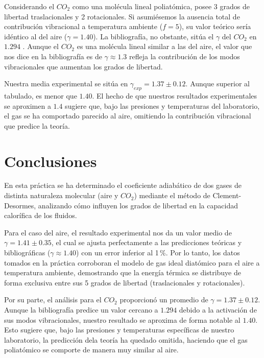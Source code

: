 \documentclass[11pt, a4paper]{article}
\begin{document}
Considerando el $CO_2$ como una molécula lineal poliatómica, posee 3 grados de libertad traslacionales y 2 rotacionales. Si asumiésemos la ausencia total de contribución vibracional a temperatura ambiente ($f=5$), su valor teórico sería idéntico al del aire ($\gamma = 1.40$). La bibliografía, no obstante, sitúa el $\gamma$ del $CO_2$ en $1.294$ \cite{young}. Aunque el $CO_2$ es una molécula lineal similar a las del aire, el valor que nos dice en la bibliografía es de $\gamma \approx 1.3$ refleja la contribución de los modos vibracionales que aumentan los grados de libertad.

Nuestra media experimental se sitúa en $\gamma_{exp} = 1.37 \pm 0.12$. Aunque superior al tabulado, es menor que $1.40$. El hecho de que nuestros resultados experimentales se aproximen a $1.4$ sugiere que, bajo las presiones y temperaturas del laboratorio, el gas se ha comportado parecido al aire, omitiendo la contribución vibracional que predice la teoría.

\section{Conclusiones}

En esta práctica se ha determinado el coeficiente adiabático de dos gases de distinta naturaleza molecular (aire y $CO_2$) mediante el método de Clement-Desormes, analizando cómo influyen los grados de libertad en la capacidad calorífica de los fluidos.

Para el caso del aire, el resultado experimental nos da un valor medio de $\gamma = 1.41 \pm 0.35$, el cual se ajusta perfectamente a las predicciones teóricas y bibliográficas ($\gamma \approx 1.40$) con un error inferior al 1\,\%. Por lo tanto, los datos tomados en la práctica corroboran el modelo de gas ideal diatómico para el aire a temperatura ambiente, demostrando que la energía térmica se distribuye de forma exclusiva entre sus 5 grados de libertad (traslacionales y rotacionales).

Por su parte, el análisis para el $CO_2$ proporcionó un promedio de $\gamma = 1.37 \pm 0.12$. Aunque la bibliografía predice un valor cercano a $1.294$ debido a la activación de sus modos vibracionales, nuestro resultado se aproxima de forma notable al $1.40$. Esto sugiere que, bajo las presiones y temperaturas específicas de nuestro laboratorio, la predicción dela teoría ha quedado omitida, haciendo que el gas poliatómico se comporte de manera muy similar al aire.
\end{document}
